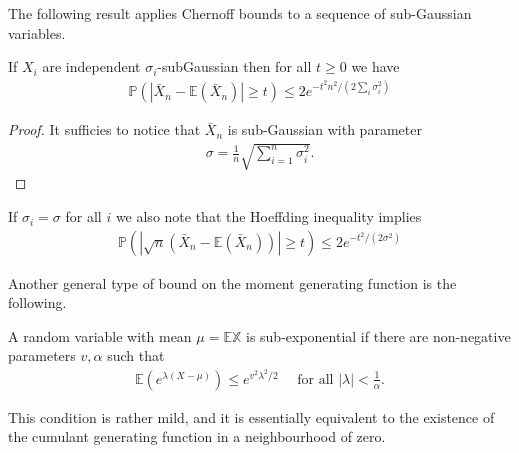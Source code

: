 The following result applies Chernoff bounds to a sequence of sub-Gaussian variables.

\begin{prop}
     If $X_i$ are independent $\sigma_i$-subGaussian then for all $t \geq 0$ we have
\begin{align*}
\mathbb{P}\left(\left|\bar{X}_n-\mathbb{E}\left(\bar{X}_n\right)\right| \geq t\right) \leq 2 e^{-t^2 n^2 /\left(2 \sum_i \sigma_i^2\right)}
\end{align*}
\end{prop}


\begin{proof}
    It sufficies to notice that $\bar{X}_n$ is sub-Gaussian with parameter
\begin{align*}
\sigma=\frac{1}{n} \sqrt{\sum_{i=1}^n \sigma_i^2}.
\end{align*}
\end{proof}

\begin{remark}
    If $\sigma_i=\sigma$ for all $i$ we also note that the Hoeffding inequality implies
\begin{align*}
\mathbb{P}\left(\left|\sqrt{n}\left(\bar{X}_n-\mathbb{E}\left(\bar{X}_n\right)\right)\right| \geq t\right) \leq 2 e^{-t^2 /\left(2 \sigma^2\right)}
\end{align*}
\end{remark}

Another general type of bound on the moment generating function is the following.
\begin{de}
    A random variable with mean $\mu=\mathbb{E X}$ is sub-exponential if there are non-negative parameters $v, \alpha$ such that
\begin{align*}
\mathbb{E}\left(e^{\lambda(X-\mu)}\right) \leq e^{v^2 \lambda^2 / 2} \quad \text { for all }|\lambda|<\frac{1}{\alpha} .
\end{align*}
\end{de}

\begin{remark}
    This condition is rather mild, and it is essentially equivalent to the existence of the cumulant generating function in a neighbourhood of zero.
\end{remark}


